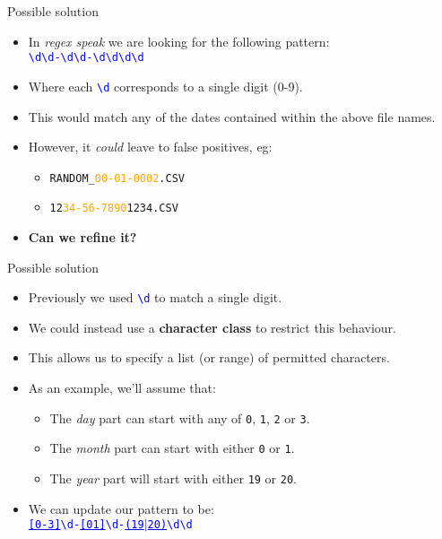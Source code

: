 \documentclass[
	usenames,
	dvipsnames,
	handout
] {beamer}
\newcommand{\reDigit}{\textbackslash{}d}
\newcommand{\rePattern}[1]{{\Large\texttt{\textcolor{blue}{#1}}}}
\begin{document}
\begin{frame}{Possible solution}
	\begin{itemize}[label=\textbullet]
		\item In \textit{regex speak} we are looking for the following pattern: \\
		      \bigskip
		      \hspace*{3em}
		      \rePattern{\reDigit\reDigit-\reDigit\reDigit-\reDigit\reDigit\reDigit\reDigit}
				\pause
		      \bigskip		      
		\item Where each \rePattern{\reDigit} corresponds to a single digit (0-9).
		      \pause
		\item This would match any of the dates contained within the above file names.
		      \pause
		\item However, it \textit{could} leave to false positives, eg:
		      \begin{itemize}[label=\textendash]
			      	\item \texttt{RANDOM\_\textcolor{orange}{00-01-0002}.CSV}
			      	      \pause
			      	\item \texttt{12\textcolor{orange}{34-56-7890}1234.CSV}
			      		\pause
		      \end{itemize}		      
		\item \textbf{Can we refine it?}
	\end{itemize}
\end{frame}
    
\begin{frame}{Possible solution}
	\begin{itemize}[label=\textbullet]
		\item Previously we used \rePattern{\reDigit} to match a single digit.
		      \pause
		\item We could instead use a \textbf{character class} to restrict this behaviour.
		      \pause
		\item This allows us to specify a list (or range) of permitted characters.
		      \pause
		\item As an example, we'll assume that:
		      \pause
		      \begin{itemize}[label=\textendash]
			      	\item The \textit{day} part can start with any of \texttt{0}, \texttt{1}, \texttt{2} or \texttt{3}.
			      	      \pause
			      	\item The \textit{month} part can start with either \texttt{0} or \texttt{1}.
			      	      \pause
			      	\item The \textit{year} part will start with either \texttt{19} or \texttt{20}.
			      		\pause
		      \end{itemize}		      
		      \bigskip
		\item We can update our pattern to be: \\
		      \bigskip
		      \hspace*{3em}
		      \rePattern{\underline{[0-3]}\reDigit-\underline{[01]}\reDigit-\underline{(19$|$20)}\reDigit\reDigit}
	\end{itemize}
\end{frame}
\end{document}

